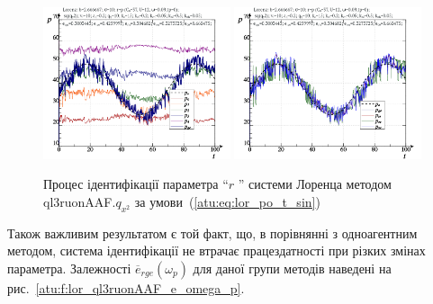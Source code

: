\begin{figure}[ht!]
  \centerline{
    \includegraphics[width=0.49\textwidth]{p/cha/lor/ql3ruonAAF/lor_ql3ruonAAF_qy2-p_t_pi_sin.png}
    \hfill
    \includegraphics[width=0.49\textwidth]{p/cha/lor/ql3ruonAAF/lor_ql3ruonAAF_qy2-p_t_pz_sin.png}
  }
\caption{Процес ідентифікації параметра ``$ r $ '' системи Лоренца методом ql3ruonAAF.$q_{x^2} $ за умови~(\ref{atu:eq:lor_po_t_sin})}
  \label{atu:f:lor_id_ql3ruonAAF.q_y2_sin}
\end{figure}

Також важливим результатом є той факт, що, в порівнянні з
одноагентним методом, система ідентифікації не втрачає
працездатності при різких змінах параметра. Залежності
$ \overline{e}_{rge} (\omega_p) $ для даної групи методів наведені на
рис.~\ref{atu:f:lor_ql3ruonAAF_e_omega_p}.


